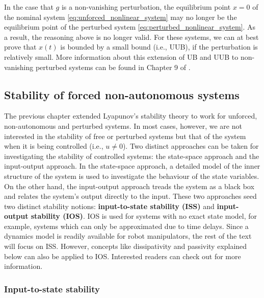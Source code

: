 In the case that $g$ is a non-vanishing perturbation, the equilibrium point $x = 0$ of the nominal system \eqref{eq:unforced_nonlinear_system} may no longer be the equilibrium point of the perturbed system \eqref{eq:perturbed_nonlinear_system}. As a result, the reasoning above is no longer valid. For these systems, we can at best prove that $x\left(t\right)$ is bounded by a small bound (i.e., UUB), if the perturbation is relatively small. More information about this extension of UB and UUB to non-vanishing perturbed systems can be found in Chapter 9 of \cite{khalilNonlinearSystems2002}.

\subsection{Stability of forced non-autonomous systems}

The previous chapter extended Lyapunov's stability theory to work for unforced, non-autonomous and perturbed systems. In most cases, however, we are not interested in the stability of free or perturbed systems but that of the system when it is being controlled (i.e., $u \neq 0$). Two distinct approaches can be taken for investigating the stability of controlled systems: the state-space approach and the input-output approach. In the state-space approach, a detailed model of the inner structure of the system is used to investigate the behaviour of the state variables. On the other hand, the input-output approach treads the system as a black box and relates the system's output directly to the input. These two approaches seed two distinct stability notions: \textbf{input-to-state stability (ISS)} and \textbf{input-output stability (IOS)}. IOS is used for systems with no exact state model, for example, systems which can only be approximated due to time delays. Since a dynamics model is readily available for robot manipulators, the rest of the text will focus on ISS. However, concepts like dissipativity and passivity explained below can also be applied to IOS. Interested readers can check out \cite{khalilNonlinearControl2015} for more information.

\subsubsection{Input-to-state stability}

